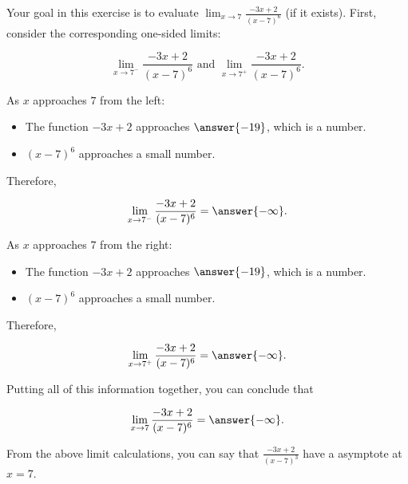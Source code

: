 \documentclass[handout]{ximera}
\begin{document}
\begin{exercise}
Your goal in this exercise is to evaluate $\displaystyle\lim_{x \to 7} \frac{-3x+2}{(x-7)^6}$ (if it exists).  First, consider the corresponding one-sided limits:

$$\displaystyle\lim_{x \to 7^-} \frac{-3x+2}{(x-7)^6} \text{ and } \displaystyle\lim_{x \to 7^+} \frac{-3x+2}{(x-7)^6}.$$

As $x$ approaches $7$ from the left:  

\begin{itemize}

\item The function $-3x+2$ approaches $\answer{-19}$, which is a  number. 

\item $(x-7)^6$ approaches a small  number. 

\end{itemize}

Therefore, 

 \[ \displaystyle\lim_{x \to 7^-} \frac{-3x+2}{(x-7)^6} = \answer{-\infty}.\]
 
As $x$ approaches $7$ from the right: 

\begin{itemize}

\item The function $-3x+2$ approaches $\answer{-19}$, which is a  number. 

\item $(x-7)^6$ approaches a small  number. 

\end{itemize}

Therefore, 

 \[ \displaystyle\lim_{x \to 7^+} \frac{-3x+2}{(x-7)^6} = \answer{-\infty}. \]

Putting all of this information together, you can conclude that

\[ \displaystyle\lim_{x \to 7} \frac{-3x+2}{(x-7)^6} = \answer{-\infty}. \]

\begin{exercise}

From the above limit calculations, you can say that $\frac{-3x+2}{(x-7)^3}$  have a  asymptote at $x =7$. 

\end{exercise}

\end{exercise}
\end{document}

